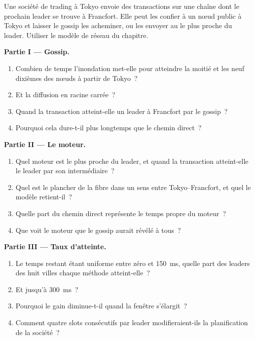 \begin{problem}\label{pb:nw:on-chain-connectivity:1}
Une société de trading à Tokyo envoie des transactions sur une chaîne dont le prochain leader se trouve à Francfort. Elle peut les confier à un nœud public à Tokyo et laisser le gossip les acheminer,
ou les envoyer au  le plus proche du leader. Utiliser le modèle de réseau du chapitre.

\medskip\noindent\textbf{Partie I --- Gossip.}
\begin{enumerate}
\item Combien de temps l'inondation met-elle pour atteindre la moitié et les neuf dixièmes des nœuds à partir de Tokyo~?
\item Et la diffusion en racine carrée~?
\item Quand la transaction atteint-elle un leader à Francfort par le gossip~?
\item Pourquoi cela dure-t-il plus longtemps que le chemin direct~?
\end{enumerate}

\medskip\noindent\textbf{Partie II --- Le moteur.}
\begin{enumerate}[resume]
\item Quel moteur est le plus proche du leader, et quand la transaction atteint-elle le leader par son intermédiaire~?
\item Quel est le plancher de la fibre dans un sens entre Tokyo--Francfort, et quel  le modèle retient-il~?
\item Quelle part du chemin direct représente le temps propre du moteur~?
\item Que voit le moteur que le gossip aurait révélé à tous~?
\end{enumerate}

\medskip\noindent\textbf{Partie III --- Taux d'atteinte.}
\begin{enumerate}[resume]
\item Le temps restant étant uniforme entre zéro et \qty{150}{\milli\second}, quelle part des leaders des huit villes chaque méthode atteint-elle~?
\item Et jusqu'à \qty{300}{\milli\second}~?
\item Pourquoi le gain diminue-t-il quand la fenêtre s'élargit~?
\item Comment quatre slots consécutifs par leader modifieraient-ils la planification de la société~?
\end{enumerate}


\end{problem}
